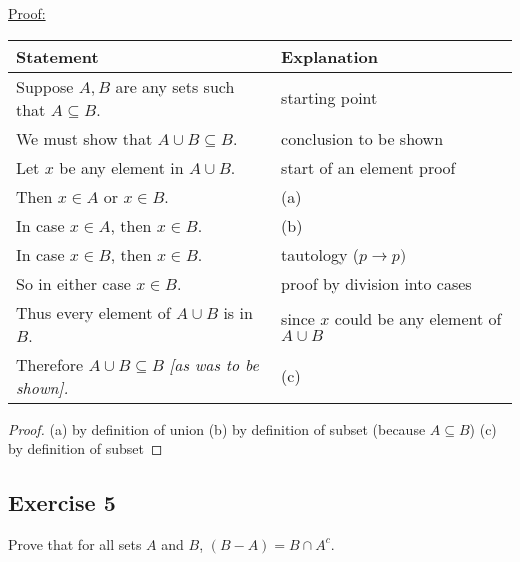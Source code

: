 \documentclass[14pt]{extarticle}
\newcommand{\fbl}{\underline{\hspace{1cm}}\,\,}
\newcommand{\cy}{\color{cyan}}
\begin{document}
\underline{Proof:}
\begin{center}
  \begin{tabular}{|l|l|}
    \hline
    {\bf Statement}                                                & {\bf Explanation}                            \\
    \hline
    Suppose $A, B$ are any sets such that \(A \subseteq B\).       & starting point                               \\
    \hline
    We must show that \(A \cup B \subseteq B\).                    & conclusion to be shown                       \\
    \hline
    Let $x$ be any element in $A \cup B$.                          & start of an element proof                    \\
    \hline
    Then $x \in A$ or $x \in B$.                                   & {\cy (a)} \fbl                               \\
    \hline
    In case $x \in A$, then $x \in B$.                             & {\cy (b)} \fbl                               \\
    \hline
    In case $x \in B$, then $x \in B$.                             & tautology ($p \to p)$                        \\
    \hline
    So in either case $x \in B$.                                   & proof by division into cases                 \\
    \hline
    Thus every element of $A \cup B$ is in $B$.                    & since $x$ could be any element of $A \cup B$ \\
    \hline
    Therefore \(A \cup B \subseteq B\) {\it [as was to be shown].} & {\cy (c)} \fbl                               \\
    \hline
  \end{tabular}
\end{center}

\begin{proof}
  (a) by definition of union (b) by definition of subset (because \(A \subseteq B\)) (c) by definition of subset
\end{proof}

\subsection{Exercise 5}
Prove that for all sets $A$ and $B$, \((B - A) = B \cap A^c\).
\end{document}
